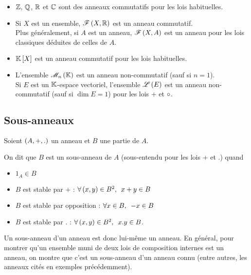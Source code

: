 \begin{ex}
\begin{itemize}
    \item \(\mathbb{Z}\), \(\mathbb{Q}\), \(\mathbb{R}\) et \(\mathbb{C}\) sont des anneaux commutatifs pour les lois habituelles. \\
    \item Si \(X\) est un ensemble, \(\mathscr{F}\left(X,\mathbb{R}\right)\) est un anneau commutatif. \\ Plus généralement, si \(A\) est un anneau, \(\mathscr{F}\left(X,A\right)\) est un anneau pour les lois classiques déduites de celles de \(A\). \\
    \item \(\poly\) est un anneau commutatif pour les lois habituelles. \\
    \item L'ensemble \(\M{n}\) est un anneau non-commutatif (sauf si \(n=1\)). \\ Si \(E\) est un \(\mathbb{K}\)-espace vectoriel, l'ensemble \(\mathscr{L}\left(E\right)\) est un anneau non-commutatif (sauf si \(\dim E=1\)) pour les lois \(+\) et \(\circ\).
\end{itemize}
\end{ex}

\subsection{Sous-anneaux}

\begin{defi}
Soient \(\anneau{A}[+][.]\) un anneau et \(B\) une partie de \(A\).

On dit que \(B\) est un sous-anneau de \(A\) (sous-entendu pour les lois \(+\) et \(.\)) quand

\begin{itemize}
    \item \(1_A\in B\) \\
    \item \(B\) est stable par \(+\) : \(\quantifs{\forall\paren{x,y}\in B^2}x+y\in B\) \\
    \item \(B\) est stable par opposition : \(\quantifs{\forall x\in B}-x\in B\) \\
    \item \(B\) est stable par \(.\) : \(\quantifs{\forall\paren{x,y}\in B^2}x.y\in B\).
\end{itemize}
\end{defi}

Un sous-anneau d'un anneau est donc lui-même un anneau. En général, pour montrer qu'un ensemble muni de deux lois de composition internes est un anneau, on montre que c'est un sous-anneau d'un anneau connu (entre autres, les anneaux cités en exemples précédemment).

